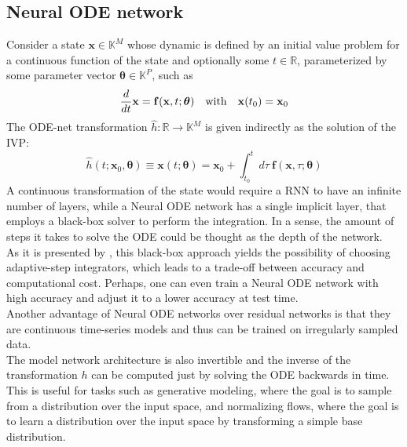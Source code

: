 \subsection{Neural ODE network}
Consider a state $\mathbf{x} \in \mathbb{K}^{M}$ whose dynamic is defined by an initial value problem for a continuous function of the state and
optionally some $t \in \mathbb{R}$, parameterized by some parameter vector $\boldsymbol{\theta} \in \mathbb{K}^{P}$, such as
\begin{equation}
  \label{eq:ODE}
  \timeder{\mathbf{x}} = \mathbf{f}(\mathbf{x}, t; \boldsymbol{\theta}) \quad \text{with} \quad \mathbf{x}(t_0) = \mathbf{x}_0 %
\end{equation}
The ODE-net transformation $\hat{h}: \mathbb{R} \to \mathbb{K}^{M}$ is given indirectly as the solution of the IVP:
\begin{equation}
  \label{eq:ODE-net}  
  \hat{h}(t; \mathbf{x}_0, \boldsymbol{\theta}) \equiv \mathbf{x}(t; \boldsymbol{\theta}) = \mathbf{x}_0 + \int_{t_0}^{t} d\tau\ \mathbf{f}(\mathbf{x}, \tau; \boldsymbol{\theta})
\end{equation}
A continuous transformation of the state would require a RNN to have an infinite number of layers, 
while a Neural ODE network has a single implicit layer, that employs a black-box solver to perform the integration.
In a sense, the amount of steps it takes to solve the ODE could be thought as the depth of the network.\\
As it is presented by \cite{chen2019neural}, this black-box approach yields the possibility of choosing adaptive-step integrators,
which leads to a trade-off between accuracy and computational cost. 
Perhaps, one can even train a Neural ODE network with high accuracy and adjust it to a lower accuracy at test time. \\
Another advantage of Neural ODE networks over residual networks is that they are continuous time-series models and thus can be trained on irregularly sampled data. \\
The model network architecture is also invertible and the inverse of the transformation $h$ can be computed just by solving the ODE backwards in time. 
This is useful for tasks such as generative modeling, where the goal is to sample from a distribution over the input space, and normalizing flows, 
where the goal is to learn a distribution over the input space by transforming a simple base distribution.\\ 

